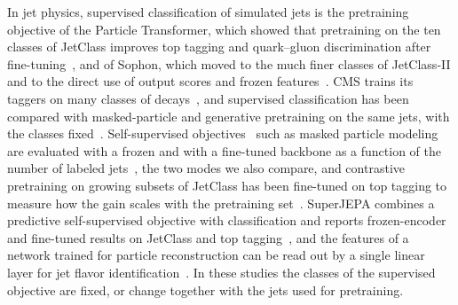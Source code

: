 In jet physics, supervised classification of simulated jets is the pretraining objective of the Particle Transformer,
which showed that pretraining on the ten classes of JetClass improves top tagging and quark--gluon discrimination after
fine-tuning~\cite{part}, and of Sophon, which moved to the much finer classes of JetClass-II and to the direct use of
output scores and frozen features~\cite{sophon}.
CMS trains its taggers on many classes of decays~\cite{cmspart,glopartdp}, and supervised classification has been
compared with masked-particle and generative pretraining on the same jets, with the classes fixed~\cite{objectives}.
Self-supervised objectives~\cite{jetclr,rs3l,mpmtok,rieck,jbot,rino} such as masked particle modeling are evaluated
with a frozen and with a fine-tuned backbone as a function of the number of labeled jets~\cite{mpm}, the two modes we
also compare, and contrastive pretraining on growing subsets of JetClass has been fine-tuned on top tagging to measure
how the gain scales with the pretraining set~\cite{zhaossl}.
SuperJEPA combines a predictive self-supervised objective with classification and reports frozen-encoder and
fine-tuned results on JetClass and top tagging~\cite{superjepa}, and the features of a network trained for particle
reconstruction can be read out by a single linear layer for jet flavor identification~\cite{mlpf_fm}.
In these studies the classes of the supervised objective are fixed, or change together with the jets used for
pretraining.
